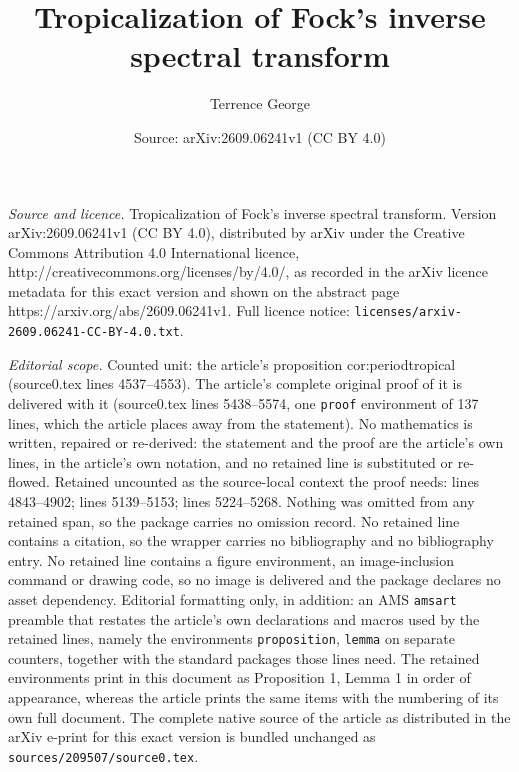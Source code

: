 \documentclass[10pt,a4paper]{amsart}
\title{Tropicalization of Fock's inverse spectral transform}
\author{Terrence George}
\date{Source: arXiv:2609.06241v1 (CC BY 4.0)}
\begin{document}
\maketitle

\noindent\emph{Source and licence.} Tropicalization of Fock's inverse spectral transform. Version arXiv:2609.06241v1 (CC BY 4.0), distributed by arXiv under the Creative Commons Attribution 4.0 International licence, http://creativecommons.org/licenses/by/4.0/, as recorded in the arXiv licence metadata for this exact version and shown on the abstract page https://arxiv.org/abs/2609.06241v1. Full licence notice: \texttt{licenses/arxiv-2609.06241-CC-BY-4.0.txt}.\par\smallskip

\noindent\textit{Editorial scope.} Counted unit: the article's proposition cor:periodtropical (source0.tex lines 4537--4553). The article's complete original proof of it is delivered with it (source0.tex lines 5438--5574, one \texttt{proof} environment of 137 lines, which the article places away from the statement). No mathematics is written, repaired or re-derived: the statement and the proof are the article's own lines, in the article's own notation, and no retained line is substituted or re-flowed.  Retained uncounted as the source-local context the proof needs: lines 4843--4902; lines 5139--5153; lines 5224--5268.  Nothing was omitted from any retained span, so the package carries no omission record.  No retained line contains a citation, so the wrapper carries no bibliography and no bibliography entry.  No retained line contains a figure environment, an image-inclusion command or drawing code, so no image is delivered and the package declares no asset dependency.  Editorial formatting only, in addition: an AMS \texttt{amsart} preamble that restates the article's own declarations and macros used by the retained lines, namely the environments \texttt{proposition}, \texttt{lemma} on separate counters, together with the standard packages those lines need.  The retained environments print in this document as Proposition 1, Lemma 1 in order of appearance, whereas the article prints the same items with the numbering of its own full document.  The complete native source of the article as distributed in the arXiv e-print for this exact version is bundled unchanged as \texttt{sources/209507/source0.tex}.
\end{document}

